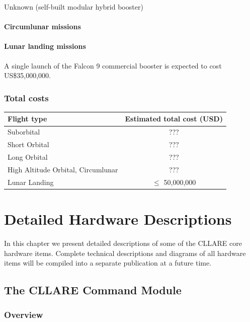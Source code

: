 \documentclass{report}
\begin{document}
Unknown (self-built modular hybrid booster)

\subsubsection{Circumlunar missions}

\subsubsection{Lunar landing missions}

A single launch of the Falcon 9 commercial booster is expected to cost US\$35,000,000.

\subsection{Total costs}

\begin{tabular}{ | l | c | }
\hline
Flight type & Estimated total cost (USD) \\
\hline
\hline
Suborbital & ??? \\
\hline
Short Orbital & ??? \\
\hline
Long Orbital & ??? \\
\hline
High Altitude Orbital, Circumlunar & ??? \\
\hline
Lunar Landing & $\leq$ 50,000,000 \\
\hline
\end{tabular}


\chapter{Detailed Hardware Descriptions} \label{chap:detail}

In this chapter we present detailed descriptions of some of the CLLARE core hardware items.  Complete technical descriptions and diagrams of all hardware items will be compiled into a separate publication at a future time.

\section{The CLLARE Command Module}

\subsection{Overview}
\end{document}
